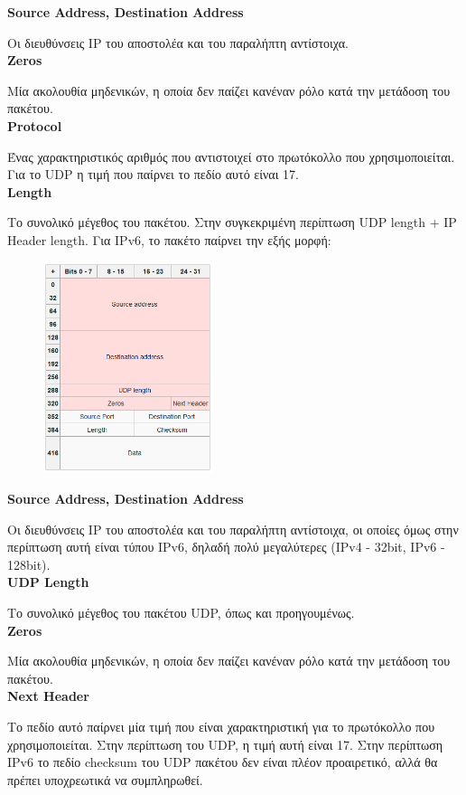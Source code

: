 \documentclass{article}
\begin{document}
\textbf{Source Address, Destination Address }
\par{Οι διευθύνσεις IP του αποστολέα και του παραλήπτη αντίστοιχα.} \\
\textbf{Zeros} 
\par{Μία ακολουθία μηδενικών, η οποία δεν παίζει κανέναν ρόλο κατά την μετάδοση του πακέτου.} \\
\textbf{Protocol }
\par{Ένας χαρακτηριστικός αριθμός που αντιστοιχεί στο πρωτόκολλο που χρησιμοποιείται. Για το UDP η τιμή που παίρνει το πεδίο αυτό είναι 17.}\\
\textbf{Length} 
\par{    Το συνολικό μέγεθος του πακέτου. Στην συγκεκριμένη περίπτωση UDP length + IP Header length. Για IPv6, το πακέτο παίρνει την εξής μορφή:} \clearpage
\begin{figure}[h!]
 \begin{center}
  \includegraphics[width=50mm,scale=0.7]{pic2.png}
\end{center}
\end{figure}
\textbf{Source Address, Destination Address }
\par{Οι διευθύνσεις IP του αποστολέα και του παραλήπτη αντίστοιχα, οι οποίες όμως στην περίπτωση αυτή είναι τύπου IPv6, δηλαδή πολύ μεγαλύτερες (IPv4 - 32bit, IPv6 - 128bit).
}\\
\textbf{UDP Length }
\par{Το συνολικό μέγεθος του πακέτου UDP, όπως και προηγουμένως.}\\
\textbf{Zeros }
\par{Μία ακολουθία μηδενικών, η οποία δεν παίζει κανέναν ρόλο κατά την μετάδοση του πακέτου.}\\
\textbf{Next Header }
\par{Το πεδίο αυτό παίρνει μία τιμή που είναι χαρακτηριστική για το πρωτόκολλο που χρησιμοποιείται. Στην περίπτωση του UDP, η τιμή αυτή είναι 17. Στην περίπτωση IPv6 το πεδίο checksum του UDP πακέτου δεν είναι πλέον προαιρετικό, αλλά θα πρέπει υποχρεωτικά να συμπληρωθεί.}
\clearpage
\end{document}
